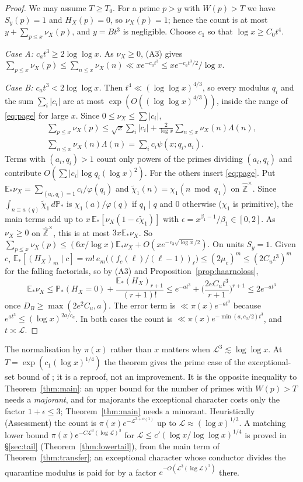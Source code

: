 \documentclass[11pt,reqno]{amsart}
\theoremstyle{definition}
\newcommand{\Lc}{\mathcal L}
\newcommand{\E}{\mathbb E}
\newcommand{\PP}{\mathbb P}
\begin{document}
\begin{proof}
We may assume $T\ge T_0$.  For a prime $p>y$ with $W(p)>T$ we have $S_y(p)=1$ and
$H_X(p)=0$, so $\nu_X(p)=1$; hence the count is at most
$y+\sum_{p\le x}\nu_X(p)$, and $y=Bt^3$ is negligible.  Choose $c_1$ so that
$\log x\ge C_0t^4$.

\emph{Case A: $c_at^3\ge2\log\log x$.}  As $\nu_X\ge0$, (A3) gives
$\sum_{p\le x}\nu_X(p)\le\sum_{n\le x}\nu_X(n)\ll xe^{-c_at^3}\le xe^{-c_at^3/2}/\log x$.

\emph{Case B: $c_at^3<2\log\log x$.}  Then $t^4\ll(\log\log x)^{4/3}$, so every
modulus $q_i$ and the sum $\sum_i|c_i|$ are at most $\exp(O((\log\log x)^{4/3}))$,
inside the range of \eqref{eq:page} for large $x$.  Since $0\le\nu_X\le\sum|c_i|$,
\begin{gather*}
 \sum_{p\le x}\nu_X(p)\le\sqrt x\sum_i|c_i|+\frac2{\log x}\sum_{n\le x}\nu_X(n)\Lambda(n),\\
 \sum_{n\le x}\nu_X(n)\Lambda(n)=\sum_ic_i\psi(x;q_i,a_i).
\end{gather*}
Terms with $(a_i,q_i)>1$ count only powers of the primes dividing $(a_i,q_i)$
and contribute $O(\sum|c_i|\log q_i(\log x)^2)$.  For the others insert
\eqref{eq:page}.  Put $\E_*\nu_X=\sum_{(a_i,q_i)=1}c_i/\varphi(q_i)$ and
$\tilde\chi_1(n)=\chi_1(n\bmod q_1)$ on $\hat{\mathbb Z}^\times$.  Since
$\int_{n\equiv a\ (q)}\tilde\chi_1\,d\PP_*$ is $\chi_1(a)/\varphi(q)$ if $q_1\mid q$ and $0$
otherwise ($\chi_1$ is primitive), the main terms add up to
$x\,\E_*[\nu_X(1-\epsilon\tilde\chi_1)]$ with $\epsilon=x^{\beta_1-1}/\beta_1\in[0,2]$.  As
$\nu_X\ge0$ on $\hat{\mathbb Z}^\times$, this is at most $3x\E_*\nu_X$.  So
$\sum_{p\le x}\nu_X(p)\le(6x/\log x)\E_*\nu_X+O(xe^{-c_3\sqrt{\log x}/2})$.
On units $S_y=1$.  Given $c$, $\E_*[(H_X)_m\mid c]=m!\,e_m\big((f_c(\ell)/(\ell-1))_\ell\big)\le(2\mu_c)^m\le(2C_ut^3)^m$
for the falling factorials, so by (A3) and Proposition~\ref{prop:haarnoloss},
\[
 \E_*\nu_X\le\PP_*(H_X=0)+\frac{\E_*(H_X)_{r+1}}{(r+1)!}\le e^{-at^3}+\Big(\frac{2eC_ut^3}{r+1}\Big)^{r+1}\le2e^{-at^3}
\]
once $D_B\ge\max(2e^2C_u,a)$.  The error term is $\ll\pi(x)e^{-at^3}$ because
$e^{at^3}\le(\log x)^{2a/c_a}$.  In both cases the count is
$\ll\pi(x)e^{-\min(a,c_a/2)t^3}$, and $t\asymp\Lc$.
\end{proof}

The normalisation by $\pi(x)$ rather than $x$ matters when $\Lc^3\lesssim\log\log x$.
At $T=\exp(c_1(\log x)^{1/4})$ the theorem gives the prime case of the
exceptional-set bound of \cite{TQ}; it is a reproof, not an improvement.  It
is the opposite inequality to Theorem~\ref{thm:main}: an upper bound for
the number of primes with $W(p)>T$ needs a \emph{majorant}, and for majorants
the exceptional character costs only the factor $1+\epsilon\le3$; Theorem~\ref{thm:main}
needs a minorant.  Heuristically (Assessment) the count is
$\pi(x)e^{-\Lc^{3+o(1)}}$ up to $\Lc\approx(\log x)^{1/3}$.  A matching lower bound
$\pi(x)e^{-C\Lc^3(\log\Lc)^3}$ for $\Lc\le c'(\log x/\log\log x)^{1/4}$ is proved in
\S\ref{sec:tail} (Theorem~\ref{thm:lowertail}), from the main term of
Theorem~\ref{thm:transfer}; an exceptional character whose conductor divides
the quarantine modulus is paid for by a factor $e^{-O(\Lc^3(\log\Lc)^3)}$ there.
\end{document}
